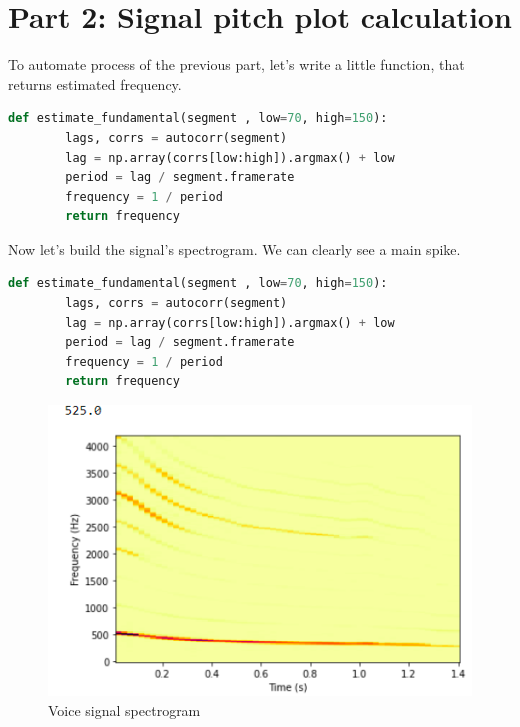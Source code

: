 \documentclass[a4paper]{article}
\begin{document}
    \newpage
        \section{Part 2: Signal pitch plot calculation}

        To automate process of the previous part, let's write a little function, that returns estimated frequency.
        
        \begin{lstlisting}[language=Python,caption=Log spectrum,label={lst:part1_2}]
    def estimate_fundamental(segment , low=70, high=150):
        lags, corrs = autocorr(segment)
        lag = np.array(corrs[low:high]).argmax() + low
        period = lag / segment.framerate
        frequency = 1 / period
        return frequency
        \end{lstlisting}
        
        Now let's build the signal's spectrogram. We can clearly see a main spike.
        
        \begin{lstlisting}[language=Python,caption=Segment frequency estimator,label={lst:part1_2}]
    def estimate_fundamental(segment , low=70, high=150):
        lags, corrs = autocorr(segment)
        lag = np.array(corrs[low:high]).argmax() + low
        period = lag / segment.framerate
        frequency = 1 / period
        return frequency
        \end{lstlisting}
        
        \begin{figure}[H]
            \centering
            \includegraphics[width=\textwidth]{img/voice_spec.png}
            \caption{Voice signal spectrogram}
            \label{fig:part1_1_2}
        \end{figure}
        
\end{document}

